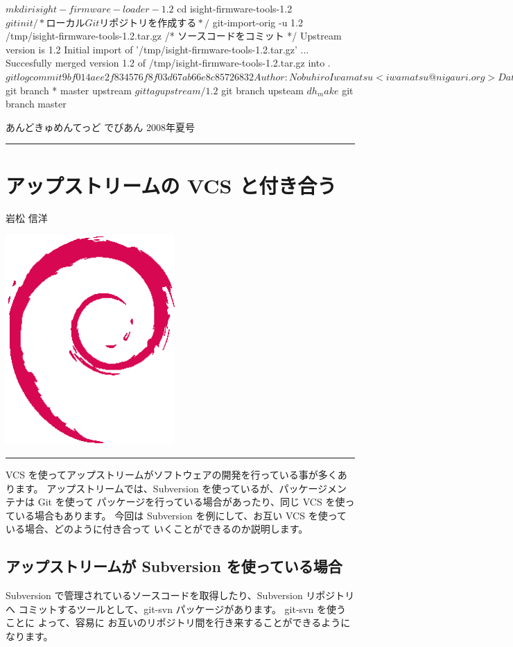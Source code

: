 \documentclass[mingoth,a4paper]{jsarticle}
\renewcommand{\dancersection}[2]{%
\newpage
あんどきゅめんてっど でびあん 2008年夏号
%
\vspace{0.1mm}\\
{\color{dancerlightblue}\rule{\hsize}{2mm}}

%
%
\begin{minipage}[t]{0.6\hsize}
\color{dancerdarkblue}
\vspace{1cm}
\section{#1}
\hfill{}#2\\
\end{minipage}
\begin{minipage}[t]{0.4\hsize}
\vspace{-2cm}
\hfill{}\includegraphics[height=8cm]{image200502/openlogo-nd.eps}\\
\vspace{-5cm}
\end{minipage}
%
%
{\color{dancerdarkblue}\rule{0.74\hsize}{2mm}}
%
\vspace{2cm}
}
\begin{document}
\begin{commandline}
$ mkdir isight-firmware-loader-1.2
$ cd isight-firmware-tools-1.2
$ git init /* ローカル Git リポジトリを作成する */
$ git-import-orig -u 1.2 /tmp/isight-firmware-tools-1.2.tar.gz /* ソースコードをコミット */
Upstream version is 1.2
Initial import of '/tmp/isight-firmware-tools-1.2.tar.gz' ...
Succesfully merged version 1.2 of /tmp/isight-firmware-tools-1.2.tar.gz into .
$ git log
commit 9bf014aee2f834576f8f03d67ab66e8c85726832
Author: Nobuhiro Iwamatsu <iwamatsu@nigauri.org>
Date:   Tue Apr 8 21:42:55 2008 +0900

    Imported Upstream version 1.2
$ git branch
* master
  upstream
$ git tag
upstream/1.2
$ git branch upsteam
$ dh_make
$ git branch master
\end{commandline}



\dancersection{アップストリームの VCS と付き合う}{岩松 信洋}
\label{sec:upstreamvcs}

VCS を使ってアップストリームがソフトウェアの開発を行っている事が多くあります。
アップストリームでは、Subversion を使っているが、パッケージメンテナは Git を使って
パッケージを行っている場合があったり、同じ VCS を使っている場合もあります。
今回は Subversion を例にして、お互い VCS を使っている場合、どのように付き合って
いくことができるのか説明します。


\subsection{アップストリームが Subversion を使っている場合 }
Subversion で管理されているソースコードを取得したり、Subversion リポジトリへ
コミットするツールとして、git-svn パッケージがあります。 git-svn を使うことに
よって、容易に お互いのリポジトリ間を行き来することができるようになります。
\end{document}

